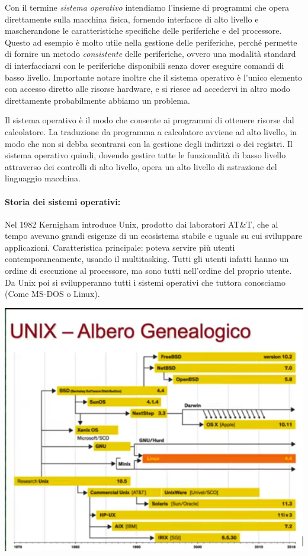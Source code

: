 \documentclass[
  paper=a4,
  oneside  ,captions=tableheading
]{scrbook}
\begin{document}
Con il termine \emph{sistema operativo} intendiamo l'insieme di
programmi che opera direttamente sulla macchina fisica, fornendo
interfacce di alto livello e mascherandone le caratteristiche specifiche
delle periferiche e del processore. Questo ad esempio è molto utile
nella gestione delle periferiche, perché permette di fornire un metodo
\emph{consistente} delle periferiche, ovvero una modalità standard di
interfacciarsi con le periferiche disponibili senza dover eseguire
comandi di basso livello. Importante notare inoltre che il sistema
operativo è l'unico elemento con accesso diretto alle risorse hardware,
e si riesce ad accedervi in altro modo direttamente probabilmente
abbiamo un problema.

Il sistema operativo è il modo che consente ai programmi di ottenere
risorse dal calcolatore. La traduzione da programma a calcolatore
avviene ad alto livello, in modo che non si debba scontrarsi con la
gestione degli indirizzi o dei registri. Il sistema operativo quindi,
dovendo gestire tutte le funzionalità di basso livello attraverso dei
controlli di alto livello, opera un alto livello di astrazione del
linguaggio macchina.

\hypertarget{storia-dei-sistemi-operativi}{%
\paragraph{Storia dei sistemi
operativi:}\label{storia-dei-sistemi-operativi}}

Nel 1982 Kernigham introduce Unix, prodotto dai laboratori AT\&T, che al
tempo avevano grandi esigenze di un ecosistema stabile e uguale su cui
sviluppare applicazioni. Caratteristica principale: poteva servire più
utenti contemporaneamente, usando il multitasking. Tutti gli utenti
infatti hanno un ordine di esecuzione al processore, ma sono tutti
nell'ordine del proprio utente. Da Unix poi si svilupperanno tutti i
sistemi operativi che tuttora conosciamo (Come MS-DOS o Linux).

\includegraphics{./image/image-20200930171019756.png}
\end{document}
